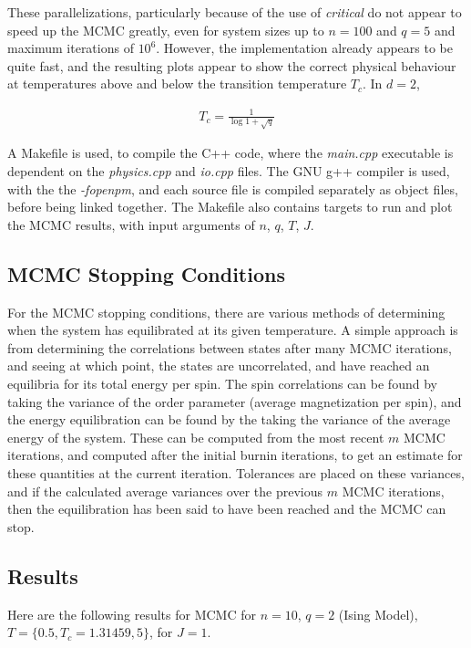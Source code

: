 \documentclass[12pt,letterpaper]{article}
\begin{document}
These parallelizations, particularly because of the use of \textit{critical} do not appear to speed up the MCMC greatly, even for system sizes up to $n=100$ and $q=5$ and maximum iterations of $10^6$. However, the implementation already appears to be quite fast, and the resulting plots appear to show the correct physical behaviour at temperatures above and below the transition temperature $T_c$. In $d=2$, 

\begin{align}
  T_c = \frac{1}{\log{1+\sqrt{q}}}
\end{align}


A Makefile is used, to compile the C++ code, where the \textit{main.cpp} executable is dependent on the \textit{physics.cpp} and \textit{io.cpp} files. The GNU g++ compiler is used, with the the \textit{-fopenpm}, and each source file is compiled separately as object files, before being linked together. The Makefile also contains targets to run and plot the MCMC results, with input arguments of $n$, $q$, $T$, $J$. 

\subsection{MCMC Stopping Conditions}
For the MCMC stopping conditions, there are various methods of determining when the system has equilibrated at its given temperature. A simple approach is from determining the correlations between states after many MCMC iterations, and seeing at which point, the states are uncorrelated, and have reached an equilibria for its total energy per spin. The spin correlations can be found by taking the variance of the order parameter (average magnetization per spin), and the energy equilibration can be found by the taking the variance of the average energy of the system. These can be computed from the most recent $m$ MCMC iterations, and computed after the initial burnin iterations, to get an estimate for these quantities at the current iteration. Tolerances are placed on these variances, and if the calculated average variances over the previous $m$ MCMC iterations, then the equilibration has been said to have been reached and the MCMC can stop.


\subsection{Results}
Here are the following results for MCMC for $n=10$, $q=2$ (Ising Model), $T=\{0.5,T_c=1.31459,5\}$, for $J = 1$.
\end{document}
